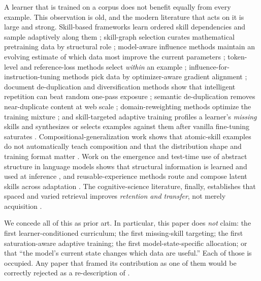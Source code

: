 \documentclass[11pt]{article}
\begin{document}
A learner that is trained on a corpus does not benefit equally from every example. This observation is old, and the modern literature that acts on it is large and strong. Skill-based frameworks learn ordered skill dependencies and sample adaptively along them \cite{chen2023skillit}; skill-graph selection curates mathematical pretraining data by structural role \cite{li2025mass}; model-aware influence methods maintain an evolving estimate of which data most improve the current parameters \cite{yu2024mates}; token-level and reference-loss methods select \emph{within} an example \cite{lin2024rho1}; influence-for-instruction-tuning methods pick data by optimizer-aware gradient alignment \cite{xia2024less}; document de-duplication and diversification methods show that intelligent repetition can beat random one-pass exposure \cite{tirumala2023d4}; semantic de-duplication removes near-duplicate content at web scale \cite{abbas2023semdedup}; domain-reweighting methods optimize the training mixture \cite{xie2023doremi}; and skill-targeted adaptive training profiles a learner's \emph{missing} skills and synthesizes or selects examples against them after vanilla fine-tuning saturates \cite{he2026stat}. Compositional-generalization work shows that atomic-skill examples do not automatically teach composition and that the distribution shape and training format matter \cite{wei2026steps}. Work on the emergence and test-time use of abstract structure in language models shows that structural information is learned and used at inference \cite{chen2026structural}, and reusable-experience methods route and compose latent skills across adaptation \cite{ling2026rex}. The cognitive-science literature, finally, establishes that spaced and varied retrieval improves \emph{retention and transfer}, not merely acquisition \cite{butler2010}.

We concede all of this as prior art. In particular, this paper does \emph{not} claim: the first learner-conditioned curriculum; the first missing-skill targeting; the first saturation-aware adaptive training; the first model-state-specific allocation; or that ``the model's current state changes which data are useful.'' Each of those is occupied. Any paper that framed its contribution as one of them would be correctly rejected as a re-description of \cite{chen2023skillit,yu2024mates,he2026stat}.
\end{document}
